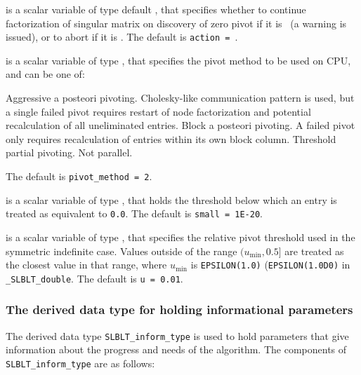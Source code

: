 \documentclass{galahad}
\newcommand{\packagename}{SLBLT}
\newcommand{\fullpackagename}{\libraryname\_\-\packagename}
\begin{document}
\begin{description}
is a scalar variable of type default \logical, that specifies whether to
continue factorization of singular matrix
on discovery of zero pivot if it is \true\ (a warning is issued), or to
abort if it is \false.
The default is {\tt action = \true}.

is a scalar variable of type \integer, that specifies the 
pivot method to be used on CPU, and can be one of:
\begin{description}
 Aggressive a posteori pivoting. Cholesky-like
communication pattern is used, but a single failed pivot
requires restart of node factorization and potential
recalculation of all uneliminated entries.
 Block a posteori pivoting. A failed pivot only requires
recalculation of entries within its own block column.
 Threshold partial pivoting. Not parallel.
\end{description}
The default is {\tt pivot\_method = 2}.

is a scalar variable of type \realdp, that holds the threshold below which an 
entry is treated as equivalent to {\tt 0.0}.
The default is {\tt small = 1E-20}.

is a scalar variable of type \realdp, that specifies the
relative pivot threshold used in the symmetric
indefinite case. Values outside of the range $(u_{\min},0.5]$ are treated
as the closest value in that range, 
where $u_{\min}$ is {\tt EPSILON(1.0)} ({\tt EPSILON(1.0D0)} in
{\tt \fullpackagename\_double}.
The default is {\tt u = 0.01}.

\end{description}


\subsubsection{The derived data type for holding informational
 parameters}\label{typeinform}
The derived data type
{\tt \packagename\_inform\_type}
is used to hold parameters that give information about the progress and needs
of the algorithm. The components of
{\tt \packagename\_inform\_type}
are as follows:
\end{document}
